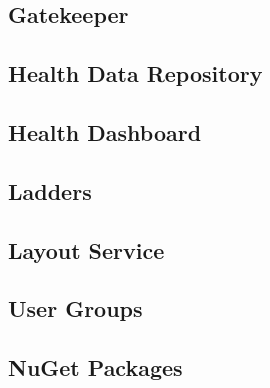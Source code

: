     \subsection{Gatekeeper}
    	
    \subsection{Health Data Repository}
    	
    \subsection{Health Dashboard}
    	
    \subsection{Ladders}
    	
    \subsection{Layout Service}
    	
    \subsection{User Groups}
    	
    \subsection{NuGet Packages}
        
